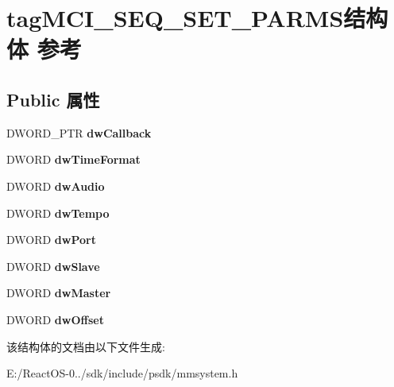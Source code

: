 \hypertarget{structtag_m_c_i___s_e_q___s_e_t___p_a_r_m_s}{}\section{tag\+M\+C\+I\+\_\+\+S\+E\+Q\+\_\+\+S\+E\+T\+\_\+\+P\+A\+R\+M\+S结构体 参考}
\label{structtag_m_c_i___s_e_q___s_e_t___p_a_r_m_s}
\subsection*{Public 属性}
\begin{DoxyCompactItemize}
\item 
\mbox{\label{structtag_m_c_i___s_e_q___s_e_t___p_a_r_m_s_a82b77cba556419d3ff62b0ae58d3905f}} 
D\+W\+O\+R\+D\+\_\+\+P\+TR {\bfseries dw\+Callback}
\item 
\mbox{\label{structtag_m_c_i___s_e_q___s_e_t___p_a_r_m_s_a202c96a290f3ae948a5fd97ce60fc4fa}} 
D\+W\+O\+RD {\bfseries dw\+Time\+Format}
\item 
\mbox{\label{structtag_m_c_i___s_e_q___s_e_t___p_a_r_m_s_a874f6a0f4d90149832638ce027c7735a}} 
D\+W\+O\+RD {\bfseries dw\+Audio}
\item 
\mbox{\label{structtag_m_c_i___s_e_q___s_e_t___p_a_r_m_s_a3739cbf04d0b8dc4f42bfd1801c7520c}} 
D\+W\+O\+RD {\bfseries dw\+Tempo}
\item 
\mbox{\label{structtag_m_c_i___s_e_q___s_e_t___p_a_r_m_s_a199072750122574a2ff9f45535d6ec7a}} 
D\+W\+O\+RD {\bfseries dw\+Port}
\item 
\mbox{\label{structtag_m_c_i___s_e_q___s_e_t___p_a_r_m_s_a052bf80d1c996151acd309ec8c3d94e4}} 
D\+W\+O\+RD {\bfseries dw\+Slave}
\item 
\mbox{\label{structtag_m_c_i___s_e_q___s_e_t___p_a_r_m_s_a18fb84c10a1017e6b9f91f24dccc044a}} 
D\+W\+O\+RD {\bfseries dw\+Master}
\item 
\mbox{\label{structtag_m_c_i___s_e_q___s_e_t___p_a_r_m_s_a513d3ffc477e96932f403a69329423d1}} 
D\+W\+O\+RD {\bfseries dw\+Offset}
\end{DoxyCompactItemize}


该结构体的文档由以下文件生成\+:\begin{DoxyCompactItemize}
\item 
E\+:/\+React\+O\+S-\/0../sdk/include/psdk/mmsystem.\+h\end{DoxyCompactItemize}
